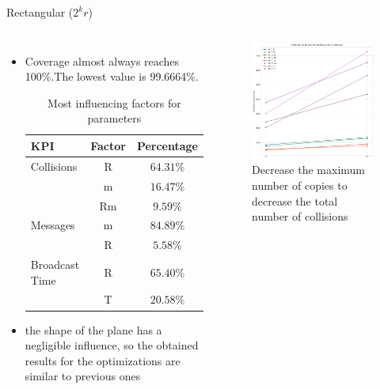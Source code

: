 \documentclass[aspectratio=169]{beamer}
\begin{document}
\begin{frame}{Rectangular  (\(2^{k}r\))}
		\begin{columns}
		 \begin{itemize}
		     \item
	Coverage almost always reaches 100\%.The lowest value is 99.6664\%. \\[5pt]

		\begin{table}
			\begin{tabular}{l | c | c}
				KPI & Factor & Percentage \\
				\hline \hline
				Collisions & R & \(64.31 \%\) \\
				& m & \(16.47\%\) \\& Rm& \(9.59 \%\) \\
				\hline
				Messages & m & \(84.89\%\) \\& R & \(5.58\%\) \\
				\hline
				Broadcast Time & R & \(65.40\%\) \\
				& T & \(20.58\%\) \\
				\hline
			\end{tabular}
			\caption{Most influencing factors for parameters}
		\end{table}
		\item the shape of the plane has a negligible influence, so the obtained results for the optimizations are similar to previous ones
		\end{itemize}
				\begin{figure}
		    \includegraphics[height=0.65\textheight]{img/rect/collisions_m_perfplot.png}
		    \caption{Decrease the maximum number of copies to decrease the total
number of collisions}
		\end{figure}

	\end{columns}
\end{frame}
\end{document}
